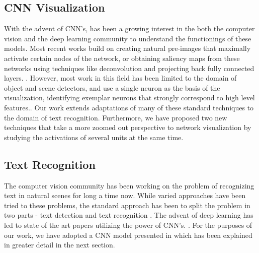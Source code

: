\documentclass[10pt,twocolumn,letterpaper]{article}
\begin{document}
\subsection{CNN Visualization}
With the advent of CNN's, has been a growing interest in the both the computer vision and the deep learning community to understand the functionings of these models. Most recent works build on creating natural pre-images \cite{DBLP:journals/corr/MahendranV15} that maximally activate certain nodes of the network, or obtaining saliency maps from these networks using techniques like deconvolution \cite{DBLP:journals/corr/ZeilerF13} and
projecting back fully connected layers. \cite{DBLP:journals/corr/SimonyanVZ13}. However, most work in this field has been limited to the domain of object and scene detectors, and use a single neuron as the basis of the visualization, identifying exemplar neurons that strongly correspond to high level features.\cite{zhou2014object,DBLP:journals/corr/GirshickDDM13,DBLP:journals/corr/MahendranV15,DBLP:journals/corr/ZeilerF13,DBLP:journals/corr/SimonyanVZ13,mahendran2015understanding}. Our work extends adaptations of many of these standard techniques \cite{yosinski2015understanding} to the domain of text recognition. Furthermore, we have proposed two new techniques that take a more zoomed out perspective to network visualization by studying the activations of several units at the same time.


\subsection{Text Recognition}


The computer vision community has been working on the problem of recognizing text in natural scenes for long a time now\cite{1315187}. While varied approaches have been tried to these problems, the standard approach has been to split the problem in two parts - text detection and text recognition \cite{PosnerEtAl-IROS2010,Neumann:2011:TLR:2066306.2067476,Yang:2014:FIV:2583855.2583972,6751121,KaiWang:2011:EST:2355573.2356398,Weinman:2014:TIS:2574225.2574484,DBLP:journals/corr/AlsharifP13,6751207}. The advent of deep learning has led to state of the art papers utilizing the power of CNN's. \cite{Jaderberg14,Jaderberg14d,Gupta16,6460871}. For the purposes of our work, we have adopted a CNN model presented in \cite{Jaderberg14c} which has been explained in greater detail in the next section.
\end{document}
